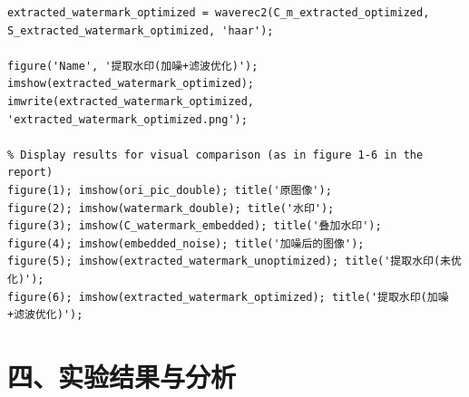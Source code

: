 \documentclass[12pt, a4paper]{article}
\begin{document}
\begin{small}
\begin{verbatim}
extracted_watermark_optimized = waverec2(C_m_extracted_optimized, S_extracted_watermark_optimized, 'haar');

figure('Name', '提取水印(加噪+滤波优化)');
imshow(extracted_watermark_optimized);
imwrite(extracted_watermark_optimized, 'extracted_watermark_optimized.png');

% Display results for visual comparison (as in figure 1-6 in the report)
figure(1); imshow(ori_pic_double); title('原图像');
figure(2); imshow(watermark_double); title('水印');
figure(3); imshow(C_watermark_embedded); title('叠加水印');
figure(4); imshow(embedded_noise); title('加噪后的图像');
figure(5); imshow(extracted_watermark_unoptimized); title('提取水印(未优化)');
figure(6); imshow(extracted_watermark_optimized); title('提取水印(加噪+滤波优化)');
\end{verbatim}
\end{small}

\section*{四、实验结果与分析}
\end{document}
